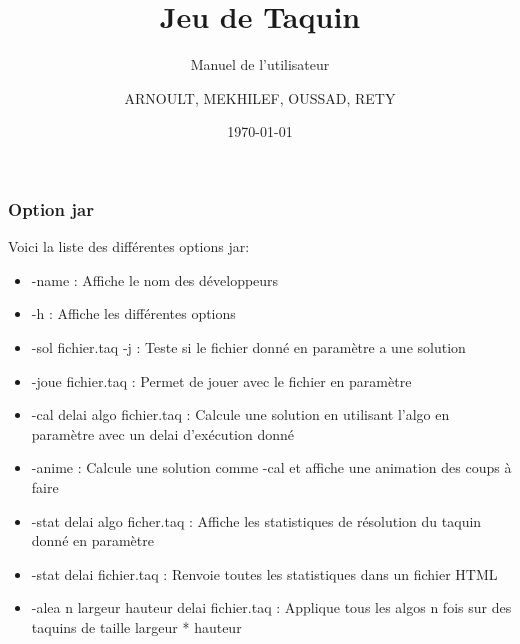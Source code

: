 \documentclass{beamer}
\title{Jeu de Taquin}
\subtitle{Manuel de l'utilisateur}
\author{ARNOULT, MEKHILEF, OUSSAD, RETY}
\institute{Université d'Orléans}
\date{\today}
\begin{document}
  \begin{frame}
   \titlepage
  \end{frame}

  \begin{frame}
   \frametitle{Option jar}
	Voici la liste des différentes options jar:
	\begin{itemize}
	\item -name : Affiche le nom des développeurs
	\item -h : Affiche les différentes options
	\item -sol fichier.taq -j : Teste si le fichier donné en paramètre a une solution
	\item -joue fichier.taq : Permet de jouer avec le fichier en paramètre
	\item -cal delai algo fichier.taq : Calcule une solution en utilisant l'algo en paramètre avec un delai d'exécution donné
	\end{itemize}
   \end{frame}
   
   \begin{frame}
    \begin{itemize}
     \item -anime : Calcule une solution comme -cal et affiche une animation des coups à faire
	\item -stat delai algo ficher.taq : Affiche les statistiques de résolution du taquin donné en paramètre
	\item -stat delai fichier.taq : Renvoie toutes les statistiques dans un fichier HTML
	\item -alea n largeur hauteur delai fichier.taq : Applique tous les algos n fois sur des taquins de taille largeur * hauteur
    \end{itemize}

   \end{frame}
\end{document}
